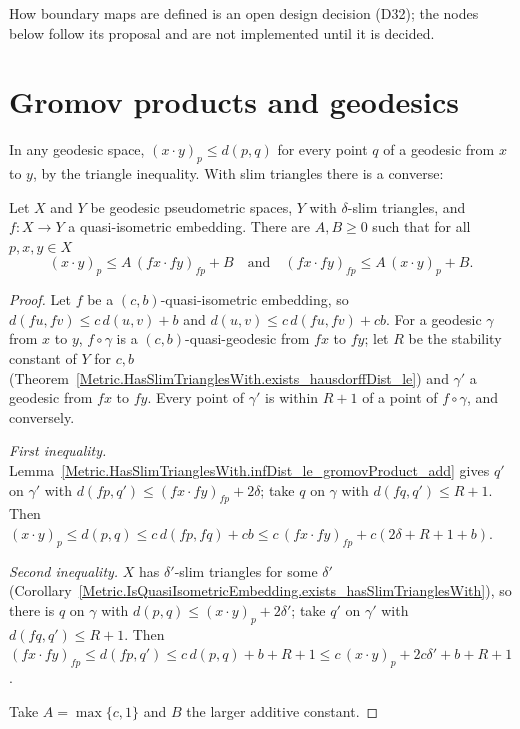 How boundary maps are defined is an open design decision (D32); the nodes below follow its
proposal and are not implemented until it is decided.

\section*{Gromov products and geodesics}

In any geodesic space, $(x \cdot y)_p \le d(p, q)$ for every point $q$ of a geodesic from $x$ to
$y$, by the triangle inequality. With slim triangles there is a converse:


\begin{lemma}
  \label{Metric.IsQuasiIsometricEmbedding.exists_gromovProduct_le}
  Let $X$ and $Y$ be geodesic pseudometric spaces, $Y$ with $\delta$-slim triangles, and $f \colon
  X \to Y$ a quasi-isometric embedding. There are $A, B \ge 0$ such that for all $p, x, y \in X$
  \[ (x \cdot y)_p \le A\,(f x \cdot f y)_{f p} + B \quad\text{and}\quad
     (f x \cdot f y)_{f p} \le A\,(x \cdot y)_p + B. \]
\end{lemma}
\begin{proof}
  Let $f$ be a $(c, b)$-quasi-isometric embedding, so $d(f u, f v) \le c\,d(u, v) + b$ and $d(u, v)
  \le c\,d(f u, f v) + cb$. For a geodesic $\gamma$ from $x$ to $y$, $f \circ \gamma$ is a $(c,
  b)$-quasi-geodesic from $f x$ to $f y$; let $R$ be the stability constant of $Y$ for $c, b$
  (Theorem~\ref{Metric.HasSlimTrianglesWith.exists_hausdorffDist_le}) and $\gamma'$ a geodesic from
  $f x$ to $f y$. Every point of $\gamma'$ is within $R + 1$ of a point of $f \circ \gamma$, and
  conversely.

  \emph{First inequality.} Lemma~\ref{Metric.HasSlimTrianglesWith.infDist_le_gromovProduct_add}
  gives $q'$ on $\gamma'$ with $d(f p, q') \le (f x \cdot f y)_{f p} + 2\delta$; take $q$ on
  $\gamma$ with $d(f q, q') \le R + 1$. Then $(x \cdot y)_p \le d(p, q) \le c\,d(f p, f q) + cb \le
  c\,(f x \cdot f y)_{f p} + c(2\delta + R + 1 + b)$.

  \emph{Second inequality.} $X$ has $\delta'$-slim triangles for some $\delta'$
  (Corollary~\ref{Metric.IsQuasiIsometricEmbedding.exists_hasSlimTrianglesWith}), so there is $q$ on
  $\gamma$ with $d(p, q) \le (x \cdot y)_p + 2\delta'$; take $q'$ on $\gamma'$ with $d(f q, q') \le
  R + 1$. Then $(f x \cdot f y)_{f p} \le d(f p, q') \le c\,d(p, q) + b + R + 1 \le c\,(x \cdot y)_p
  + 2c\delta' + b + R + 1$.

  Take $A = \max\{c, 1\}$ and $B$ the larger additive constant.
\end{proof}

